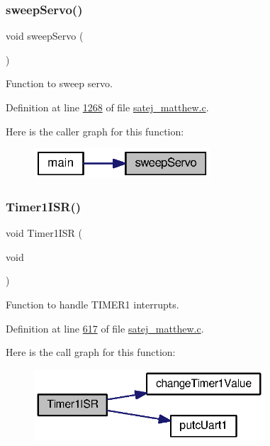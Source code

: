 \subsubsection{\texorpdfstring{sweepServo()}{sweepServo()}}
{\footnotesize\ttfamily void sweep\+Servo (\begin{DoxyParamCaption}{ }\end{DoxyParamCaption})}



Function to sweep servo. 



Definition at line \mbox{\hyperlink{satej__matthew_8c_source_l01268}{1268}} of file \mbox{\hyperlink{satej__matthew_8c_source}{satej\+\_\+matthew.\+c}}.

Here is the caller graph for this function\+:
\nopagebreak
\begin{figure}[H]
\begin{center}
\leavevmode
\includegraphics[width=186pt]{satej__matthew_8c_a086130ac68735e2ba8d56b2dfe45b914_icgraph}
\end{center}
\end{figure}
\mbox{\label{satej__matthew_8c_a7829469bbaa6a5d7e77e19e1d55b673e}} 
\subsubsection{\texorpdfstring{Timer1ISR()}{Timer1ISR()}}
{\footnotesize\ttfamily void Timer1\+I\+SR (\begin{DoxyParamCaption}\item[{void}]{ }\end{DoxyParamCaption})}



Function to handle T\+I\+M\+E\+R1 interrupts. 



Definition at line \mbox{\hyperlink{satej__matthew_8c_source_l00617}{617}} of file \mbox{\hyperlink{satej__matthew_8c_source}{satej\+\_\+matthew.\+c}}.

Here is the call graph for this function\+:
\nopagebreak
\begin{figure}[H]
\begin{center}
\leavevmode
\includegraphics[width=244pt]{satej__matthew_8c_a7829469bbaa6a5d7e77e19e1d55b673e_cgraph}
\end{center}
\end{figure}
\mbox{\label{satej__matthew_8c_af0a12620be9cfe02c43ff4c8d6556fe2}} 
